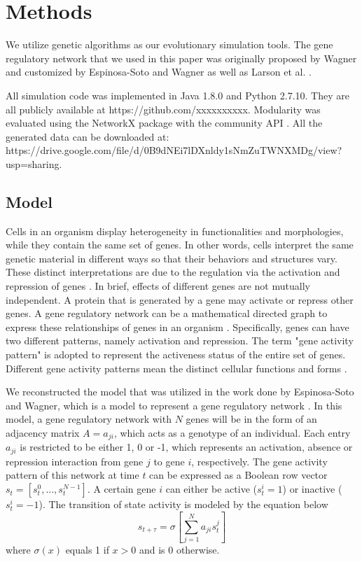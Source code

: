 \section{Methods}
We utilize genetic algorithms as our evolutionary simulation tools. The gene regulatory network that we used in this paper was originally proposed by Wagner \cite{wagner1996does} and customized by Espinosa-Soto and Wagner \cite{espinosa2010specialization} as well as Larson et al. \cite{larson2016recombination}. 

All simulation code was implemented in Java 1.8.0 and Python 2.7.10. They are all publicly available at https://github.com/xxxxxxxxxx. Modularity was evaluated using the NetworkX package with the community API \cite{hagberg2008exploring}. All the generated data can be downloaded at: https://drive.google.com/file/d/0B9dNEi7lDXnldy1sNmZuTWNXMDg/view?usp=sharing. 
\subsection{Model}
Cells in an organism display heterogeneity in functionalities and morphologies, while they contain the same set of genes. In other words, cells interpret the same genetic material in different ways so that their behaviors and structures vary. These distinct interpretations are due to the regulation via the activation and repression of genes \cite{wagner1996does}. In brief, effects of different genes are not mutually independent. A protein that is generated by a gene may activate or repress other genes. A gene regulatory network can be a mathematical directed graph to express these relationships of genes in an organism \cite{wagner1996does}. Specifically, genes can have two different patterns, namely activation and repression. The term "gene activity pattern" is adopted to represent the activeness status of the entire set of genes. Different gene activity patterns mean the distinct cellular functions and forms \cite{espinosa2010specialization}. 

We reconstructed the model that was utilized in the work done by Espinosa-Soto and Wagner, which is a model to represent a gene regulatory network \cite{espinosa2010specialization}. In this model, a gene regulatory network with $N$ genes will be in the form of an adjacency matrix $A = a_{ji}$, which acts as a genotype of an individual. Each entry $a_{ji}$ is restricted to be either 1, 0 or -1, which represents an activation, absence or repression interaction from gene $j$ to gene $i$, respectively. The gene activity pattern of this network at time $t$ can be expressed as a Boolean row vector $s_{t} = [s_{t}^0,...,s_{t}^{N-1}]$. A certain gene $i$ can either be active ($s_t^i=1$) or inactive ($s_t^i=-1$). The transition of state activity is modeled by the equation below
\begin{equation}
s_{t+\tau}=\sigma[\sum_{j=1}^{N}a_{ji}s_t^j]
\end{equation}
where $\sigma(x)$ equals 1 if $x>0$ and is 0 otherwise. 

